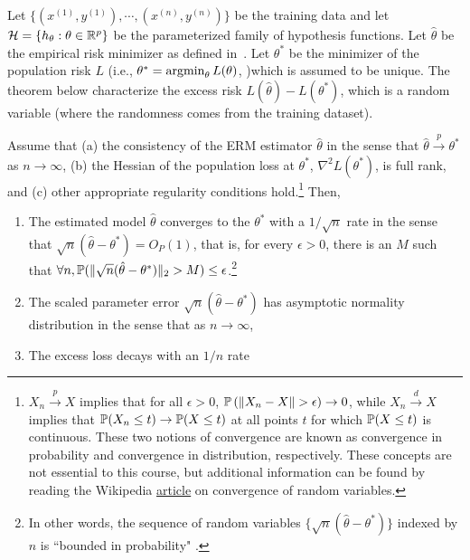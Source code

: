 Let $\{(x^{(1)},y^{(1)}), \cdots, (x^{(n)},y^{(n)})\}$ be the training data and let $\mathcal H = \{ h_\theta: \theta \in \mathbb R^p \}$ be the parameterized family of hypothesis functions. Let $\hat{\theta}$ be the empirical risk minimizer as defined in~. Let $\theta^{*}$ be the minimizer of the population risk $L$ (i.e., $\theta^{*} = \operatorname*{\textup{argmin}}_\theta L(\theta)$, )which is assumed to be unique. The theorem below characterize the excess risk $L(\hat{\theta}) - L(\theta^{*})$, which is a random variable (where the randomness comes from the training dataset). 

\begin{theorem}
Assume that (a) the consistency of the ERM estimator $\hat{\theta}$ in the sense that $\hat{\theta}  \overset{p}{\to} \theta^{*}$ as $n \to \infty$, (b) the Hessian of the population loss at $\theta^*$, $\nabla^{2}L(\theta^{*})$, is full rank, and  (c) other appropriate regularity conditions hold.\footnote{$X_n \overset{p}{\to} X$ implies that for all $\epsilon > 0$, $\mathbb P \left (\|X_n - X\| > \epsilon \right ) \to 0$, while $X_n \overset{d}{\to} X$ implies that $\mathbb P(X_n \leq t) \to \mathbb P(X \leq t)$ at all points $t$ for which $\mathbb P(X \leq t)$ is continuous. These two notions of convergence are known as convergence in probability and convergence in distribution, respectively. These concepts are not essential to this course, but additional information can be found by reading the Wikipedia \href{https://en.wikipedia.org/wiki/Convergence_of_random_variables}{article} on convergence of random variables.} 
Then,
\begin{enumerate}
    \item The estimated model $\hat{\theta}$ converges to the $\theta^*$ with a $1/\sqrt{n}$ rate in the sense that $\sqrt{n} (\hat{\theta} - \theta^{*}) = O_P(1)$, that is, for every $\epsilon > 0$, there is an $M$ such that $\forall n, \mathbb P (\| \sqrt{n} (\hat{\theta} - \theta^{*}) \|_2 > M) \le \epsilon$.\footnote{In other words, the sequence of random variables $\{ \sqrt{n} (\hat{\theta} - \theta^{*}) \}$ indexed by $n$ is ``bounded in probability" . } 
    \item  The scaled parameter error $\sqrt{n}(\hat{\theta}-\theta^{*})$ has asymptotic normality distribution in the sense that as $n\rightarrow \infty$, 
     \item The excess loss decays with an $1/n$ rate

\end{enumerate}
\end{theorem}
